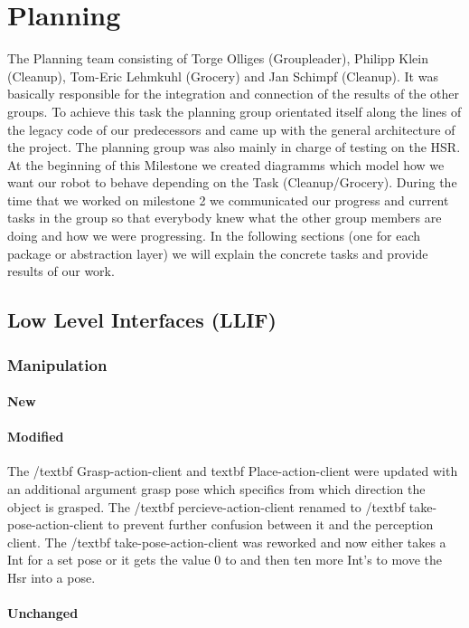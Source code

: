\documentclass[main.tex]{subfiles}
\begin{document}
	
	\chapter{Planning}
                The Planning team consisting of Torge Olliges (Groupleader), Philipp Klein (Cleanup), Tom-Eric Lehmkuhl (Grocery) and Jan Schimpf (Cleanup). It was basically responsible for the integration and connection of the results of the other groups. To achieve this task the planning group orientated itself along the lines of the legacy code of our predecessors and came up with the general architecture of the project. The planning group was also mainly in charge of testing on the HSR. At the beginning of this Milestone we created diagramms which model how we want our robot to behave depending on the Task (Cleanup/Grocery). During the time that we worked on milestone 2 we communicated our progress and current tasks in the group so that everybody knew what the other group members are doing and how we were progressing. In the following sections (one for each package or abstraction layer) we will explain the concrete tasks and provide results of our work.
                \section{Low Level Interfaces (LLIF)}
                \subsection{Manipulation}
                \subsubsection{New}
                \subsubsection{Modified}
The /textbf {Grasp-action-client} and textbf {Place-action-client} were updated with an additional argument  grasp pose which specifics from which direction the object is grasped.
The /textbf {percieve-action-client} renamed to /textbf {take-pose-action-client} to prevent further confusion between it and the perception client.
The /textbf {take-pose-action-client} was reworked and now either takes a Int for a set pose or it gets the value 0 to and then ten more Int's to move the Hsr into a pose.
                \subsubsection{Unchanged}
\end{document}
